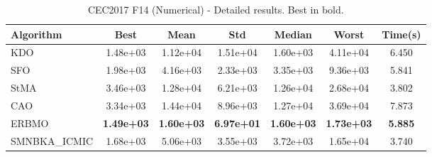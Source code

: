 \begin{table}[H]
\centering\small
\caption{CEC2017 F14 (Numerical) - Detailed results. Best in bold.}
\label{tab:cec2017_F14}
\begin{tabular}{lcccccc}
\toprule
\textbf{Algorithm} & \textbf{Best} & \textbf{Mean} & \textbf{Std} & \textbf{Median} & \textbf{Worst} & \textbf{Time(s)} \\
\midrule
KDO & 1.48e+03 & 1.12e+04 & 1.51e+04 & 1.60e+03 & 4.11e+04 & 6.450 \\
SFO & 1.98e+03 & 4.16e+03 & 2.33e+03 & 3.35e+03 & 9.36e+03 & 5.841 \\
StMA & 3.46e+03 & 1.28e+04 & 6.21e+03 & 1.26e+04 & 2.68e+04 & 3.802 \\
CAO & 3.34e+03 & 1.44e+04 & 8.96e+03 & 1.27e+04 & 3.69e+04 & 7.873 \\
ERBMO & \textbf{1.49e+03} & \textbf{1.60e+03} & \textbf{6.97e+01} & \textbf{1.60e+03} & \textbf{1.73e+03} & \textbf{5.885} \\
SMNBKA_ICMIC & 1.68e+03 & 5.06e+03 & 3.55e+03 & 3.72e+03 & 1.65e+04 & 3.740 \\
\bottomrule
\end{tabular}
\end{table}
